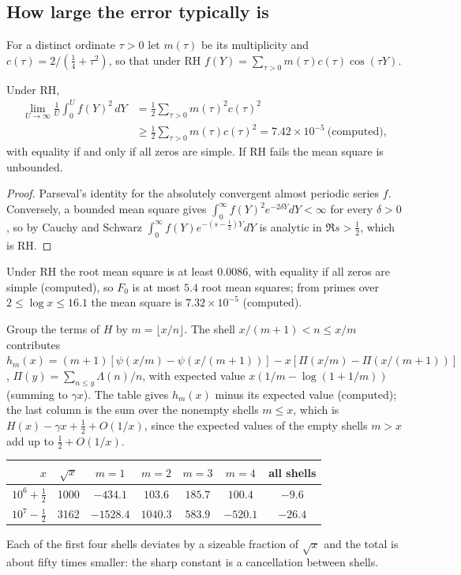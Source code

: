 \subsection{How large the error typically is}

For a distinct ordinate $\tau>0$ let $m(\tau)$ be its multiplicity and $c(\tau)=2/(\frac14+\tau^2)$, so that under RH $f(Y)=\sum_{\tau>0}m(\tau)c(\tau)\cos(\tau Y)$.

\begin{proposition}\label{sw:prop:ms}
Under RH,
\begin{align*}
\lim_{U\to\infty}\frac1U\int_0^Uf(Y)^2\,dY&=\frac12\sum_{\tau>0}m(\tau)^2c(\tau)^2\\
&\ge\frac12\sum_{\tau>0}m(\tau)c(\tau)^2=7.42\times10^{-5}\ \text{(computed)},
\end{align*}
with equality if and only if all zeros are simple. If RH fails the mean square is unbounded.
\end{proposition}

\begin{proof}
Parseval's identity for the absolutely convergent almost periodic series $f$. Conversely, a bounded mean square gives $\int_0^\infty f(Y)^2e^{-2\delta Y}dY<\infty$ for every $\delta>0$, so by Cauchy and Schwarz $\int_0^\infty f(Y)e^{-(s-\frac12)Y}dY$ is analytic in $\Re s>\frac12$, which is RH.
\end{proof}

Under RH the root mean square is at least $0.0086$, with equality if all zeros are simple (computed), so $F_0$ is at most $5.4$ root mean squares; from primes over $2\le\log x\le16.1$ the mean square is $7.32\times10^{-5}$ (computed).

\begin{remark}\label{sw:rem:shells}
Group the terms of $H$ by $m=\lfloor x/n\rfloor$. The shell $x/(m+1)<n\le x/m$ contributes $h_m(x)=(m+1)[\psi(x/m)-\psi(x/(m+1))]-x[\Pi(x/m)-\Pi(x/(m+1))]$, $\Pi(y)=\sum_{n\le y}\Lambda(n)/n$, with expected value $x(1/m-\log(1+1/m))$ (summing to $\gamma x$). The table gives $h_m(x)$ minus its expected value (computed); the last column is the sum over the nonempty shells $m\le x$, which is $H(x)-\gamma x+\frac12+O(1/x)$, since the expected values of the empty shells $m>x$ add up to $\frac12+O(1/x)$.
\begin{center}
\small
\begin{tabular}{rcccccc}
\toprule
$x$ & $\sqrt x$ & $m=1$ & $m=2$ & $m=3$ & $m=4$ & all shells\\
\midrule
$10^6+\frac12$ & 1000 & $-434.1$ & $103.6$ & $185.7$ & $100.4$ & $-9.6$\\
$10^7-\frac12$ & 3162 & $-1528.4$ & $1040.3$ & $583.9$ & $-520.1$ & $-26.4$\\
\bottomrule
\end{tabular}
\end{center}
Each of the first four shells deviates by a sizeable fraction of $\sqrt x$ and the total is about fifty times smaller: the sharp constant is a cancellation between shells.
\end{remark}

